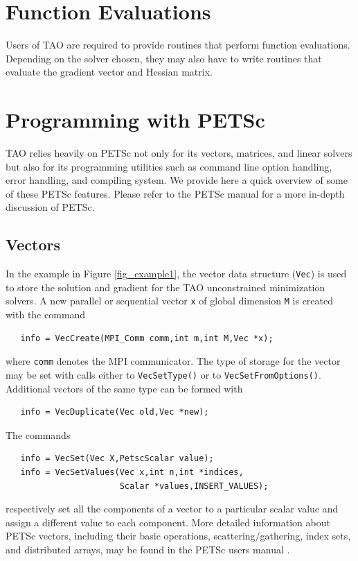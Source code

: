\documentclass[]{book}
\begin{document}
\section{Function Evaluations}

Users of TAO are required to provide routines that perform function
evaluations. Depending on the solver chosen, they may also have to
write routines that evaluate the gradient vector and Hessian matrix.

\section{Programming with PETSc}
\label{sec_tao_programming}
TAO relies heavily on PETSc not only for its vectors, matrices, and linear
solvers but also for its programming utilities such as command line option 
handling, error handling, and compiling system.  We provide here a quick 
overview of some of these PETSc features.  Please refer to the PETSc 
manual \cite{petsc-user-ref} for a more in-depth
discussion of PETSc.

\subsection*{Vectors}

In the example in Figure \ref{fig_example1}, the vector data structure
(\texttt{Vec}) is used to store the solution and gradient for the TAO
unconstrained minimization solvers.  A new parallel or sequential
vector \texttt{x} of global dimension \texttt{M} is created with the
command 
\begin{verbatim}
   info = VecCreate(MPI_Comm comm,int m,int M,Vec *x);
\end{verbatim}
\noindent
where \texttt{comm} denotes the MPI communicator. The type of storage
for the vector may be set with calls either to \texttt{VecSetType()}
or to \texttt{VecSetFromOptions()}.  Additional vectors of the same type
can be formed with 
\begin{verbatim}
   info = VecDuplicate(Vec old,Vec *new);
\end{verbatim}
\noindent
The commands
\begin{verbatim}
   info = VecSet(Vec X,PetscScalar value);
   info = VecSetValues(Vec x,int n,int *indices,
                       Scalar *values,INSERT_VALUES);
\end{verbatim}
\noindent
respectively set all the components of a vector to a particular scalar
value and assign a different value to each component.  More detailed
information about PETSc vectors, including their basic operations,
scattering/gathering, index sets, and distributed arrays, may be found
in the PETSc users manual \cite{petsc-user-ref}.
\end{document}
